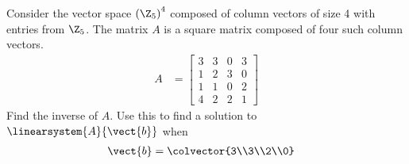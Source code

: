Consider the vector space $\left(\Z_5\right)^4$ composed of column vectors of size 4 with entries from $\Z_5$.  The matrix $A$ is a square matrix composed of four such column vectors.
%
\begin{align*}
A&=
\begin{bmatrix}
 3 & 3 & 0 & 3 \\
 1 & 2 & 3 & 0 \\
 1 & 1 & 0 & 2 \\
 4 & 2 & 2 & 1
\end{bmatrix}
%
\end{align*}
%
Find the inverse of $A$.  Use this to find a solution to $\linearsystem{A}{\vect{b}}$ when 
%
\begin{align*}
\vect{b}&=\colvector{3\\3\\2\\0}
\end{align*}
%
